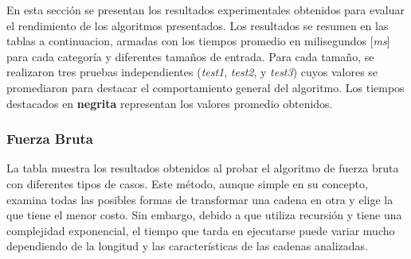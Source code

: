 En esta sección se presentan los resultados experimentales obtenidos para evaluar el rendimiento de los algoritmos presentados. Los resultados se resumen en las tablas a continuacion, armadas con los tiempos promedio en milisegundos [\textit{ms}] para cada categoría y diferentes tamaños de entrada. Para cada tamaño, se realizaron tres pruebas independientes (\textit{test1}, \textit{test2}, y \textit{test3}) cuyos valores se promediaron para destacar el comportamiento general del algoritmo. Los tiempos destacados en \textbf{negrita} representan los valores promedio obtenidos.

\subsubsection*{Fuerza Bruta}
La tabla muestra los resultados obtenidos al probar el algoritmo de fuerza bruta con diferentes tipos de casos. Este método, aunque simple en su concepto, examina todas las posibles formas de transformar una cadena en otra y elige la que tiene el menor costo. Sin embargo, debido a que utiliza recursión y tiene una complejidad exponencial, el tiempo que tarda en ejecutarse puede variar mucho dependiendo de la longitud y las características de las cadenas analizadas.

